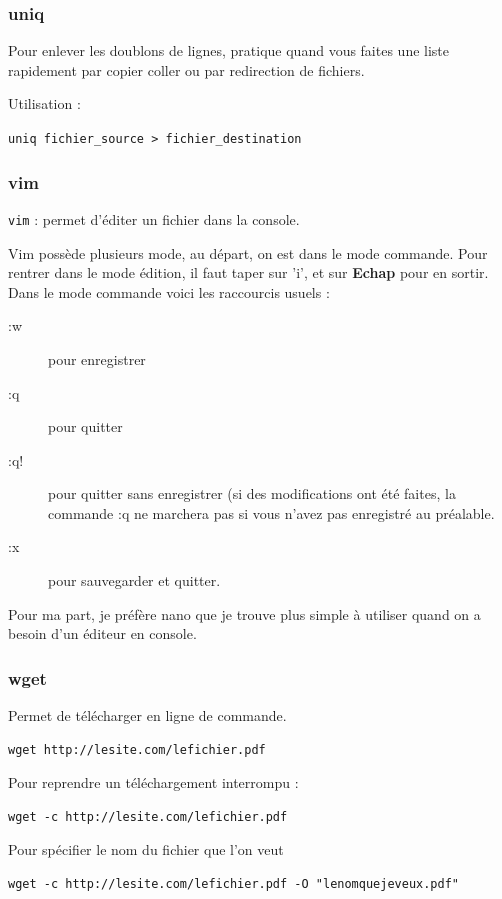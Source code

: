 \documentclass[a4paper,twoside]{article}
\begin{document}
\subsubsection{uniq}
Pour enlever les doublons de lignes, pratique quand vous faites une liste rapidement par copier coller ou par redirection de fichiers.

Utilisation :

\verb|uniq fichier_source > fichier_destination|

\subsubsection{vim}
\verb|vim| : permet d'éditer un fichier dans la console.\par
Vim possède plusieurs mode, au départ, on est dans le mode commande. Pour rentrer dans le mode édition, il faut taper sur 'i', et sur \textbf{Echap} pour en sortir.
Dans le mode commande voici les raccourcis usuels :
\begin{description}
 \item[ :w] pour enregistrer
\item[ :q] pour quitter
\item[ :q!] pour quitter sans enregistrer (si des modifications ont été faites, la commande :q ne marchera pas si vous n'avez pas enregistré au préalable.
\item[ :x] pour sauvegarder et quitter.
\end{description}

\begin{remarque}
Pour ma part, je préfère nano que je trouve plus simple à utiliser quand on a besoin d'un éditeur en console.
\end{remarque}

\subsubsection{wget}\label{sec:wget}
Permet de télécharger en ligne de commande.

\begin{verbatim}
wget http://lesite.com/lefichier.pdf
\end{verbatim}

Pour reprendre un téléchargement interrompu :
\begin{verbatim}
wget -c http://lesite.com/lefichier.pdf
\end{verbatim}

Pour spécifier le nom du fichier que l'on veut
\begin{verbatim}
wget -c http://lesite.com/lefichier.pdf -O "lenomquejeveux.pdf"
\end{verbatim}
\end{document}
